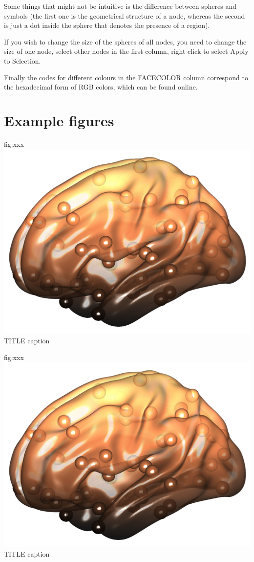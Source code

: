\documentclass{tufte-handout}
\begin{document}
Some things that might not be intuitive is the difference between spheres and symbols (the first one is the geometrical structure of a node, whereas the second is just a dot inside the sphere that denotes the presence of a region). 


If you wish to change the size of the spheres of all nodes, you need to change the size of one node, select other nodes in the first column, right click to select Apply to Selection.


Finally the codes for different colours in the FACECOLOR column correspond to the hexadecimal form of RGB colors, which can be found online.







\clearpage
\section{Example figures}

	{fig:xxx}
	{\includegraphics{tut_ba/fig1.png}}
	{TITLE}
	{
	caption
	}

	{fig:xxx}
	{\includegraphics{tut_ba/fig1.png}}
	{TITLE}
	{
	caption
	}
\end{document}
